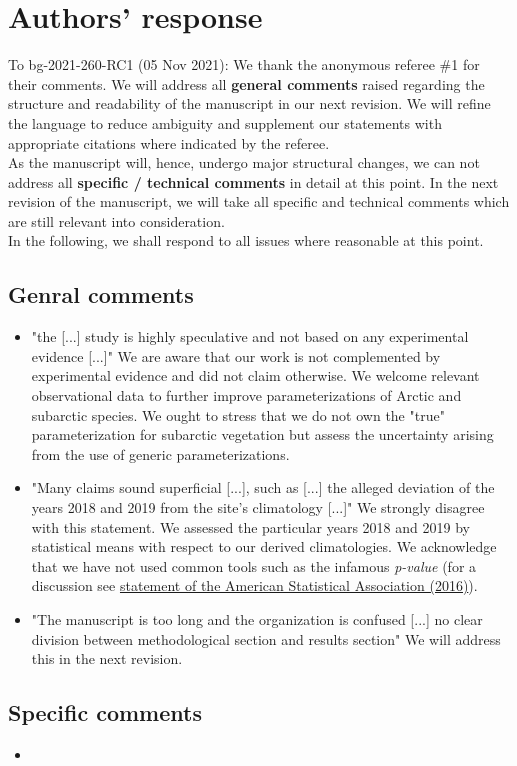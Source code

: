 \documentclass{scrartcl}
\begin{document}
\section*{Authors' response}
To bg-2021-260-RC1 (05 Nov 2021):
We thank the anonymous referee \#1 for their comments.
We will address all \textbf{general comments} raised regarding the structure and readability of the manuscript in our next revision. We will refine the language to reduce ambiguity and supplement our statements with appropriate citations where indicated by the referee.\\
As the manuscript will, hence, undergo major structural changes, we can not address all \textbf{specific / technical comments} in detail at this point. In the next revision of the manuscript, we will take all specific and technical comments which are still relevant into consideration.\\
In the following, we shall respond to all issues where reasonable at this point.

\subsection*{Genral comments} 
\begin{itemize}
    
    \item {\color{blue} "the [...] study is highly speculative and not based on any experimental evidence [...]"} We are aware that our work is not complemented by experimental evidence and did not claim otherwise. We welcome relevant observational data to further improve parameterizations of Arctic and subarctic species. We ought to stress that we do not own the "true" parameterization for subarctic vegetation but assess the uncertainty arising from the use of generic parameterizations.
    \item {\color{blue} "Many claims sound superficial [...], such as [...] the alleged deviation of the years 2018 and 2019 from the site's climatology [...]"} We strongly disagree with this statement. We assessed the particular years 2018 and 2019 by statistical means with respect to our derived climatologies. We acknowledge that we have not used common tools such as the infamous \emph{p-value} (for a discussion see \href{https://doi.org/10.1080/00031305.2016.1154108}{statement of the American Statistical Association (2016)}).
    \item {\color{blue} "The manuscript is too long and the organization is confused  [...] no clear division between methodological section and results section"} We will address this in the next revision.

\end{itemize}

\subsection*{Specific comments} 
\begin{itemize}
    
    \item {\color{blue} }

\end{itemize}
\end{document}
